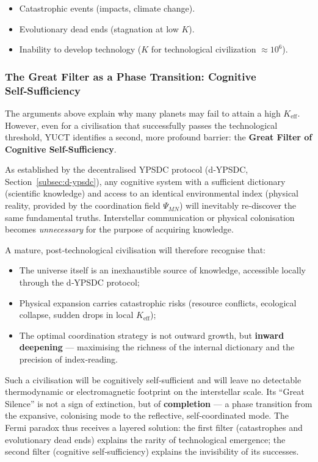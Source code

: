 \documentclass[12pt,a4paper]{article}
\theoremstyle{remark}
\begin{document}
	\begin{itemize}
		\item Catastrophic events (impacts, climate change).
		\item Evolutionary dead ends (stagnation at low $K$).
		\item Inability to develop technology ($K$ for technological civilization $\approx 10^6$).
	\end{itemize}
	
	\subsubsection*{The Great Filter as a Phase Transition: Cognitive Self‑Sufficiency}
	
	The arguments above explain why many planets may fail to attain a high
	\(K_{\mathrm{eff}}\). However, even for a civilisation that successfully
	passes the technological threshold, YUCT identifies a second, more
	profound barrier: the \textbf{Great Filter of Cognitive Self‑Sufficiency}.
	
	As established by the decentralised YPSDC protocol (d‑YPSDC,
	Section~\ref{subsec:d-ypsdc}), any cognitive system with a sufficient
	dictionary (scientific knowledge) and access to an identical environmental
	index (physical reality, provided by the coordination field \(\Psi_{MN}\))
	will inevitably re‑discover the same fundamental truths. Interstellar
	communication or physical colonisation becomes \emph{unnecessary} for the
	purpose of acquiring knowledge.
	
	A mature, post‑technological civilisation will therefore recognise that:
	\begin{itemize}[leftmargin=*]
		\item The universe itself is an inexhaustible source of knowledge,
		accessible locally through the d‑YPSDC protocol;
		\item Physical expansion carries catastrophic risks (resource conflicts,
		ecological collapse, sudden drops in local \(K_{\mathrm{eff}}\));
		\item The optimal coordination strategy is not outward growth, but
		\textbf{inward deepening} — maximising the richness of the internal
		dictionary and the precision of index‑reading.
	\end{itemize}
	
	Such a civilisation will be cognitively self‑sufficient and will leave no
	detectable thermodynamic or electromagnetic footprint on the interstellar
	scale. Its ``Great Silence'' is not a sign of extinction, but of
	\textbf{completion} — a phase transition from the expansive, colonising
	mode to the reflective, self‑coordinated mode. The Fermi paradox thus
	receives a layered solution: the first filter (catastrophes and
	evolutionary dead ends) explains the rarity of technological emergence;
	the second filter (cognitive self‑sufficiency) explains the invisibility
	of its successes.
	
\end{document}
